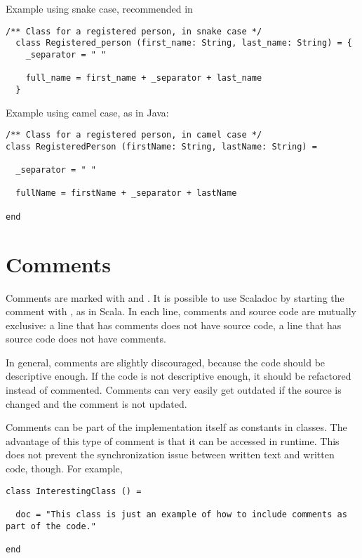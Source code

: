 Example using snake case, recommended in \Soda

\begin{lstlisting}[label={lst:exampleExtendsSnakeCase}]
  /** Class for a registered person, in snake case */
  class Registered_person (first_name: String, last_name: String) = {
    _separator = " "

    full_name = first_name + _separator + last_name
  }
\end{lstlisting}

Example using camel case, as in Java:
\begin{lstlisting}[label={lst:exampleExtendsCamelCase}]
/** Class for a registered person, in camel case */
class RegisteredPerson (firstName: String, lastName: String) =

  _separator = " "

  fullName = firstName + _separator + lastName

end
\end{lstlisting}


\section{Comments}

Comments are marked with \srccode{/*} and \srccode{*/}.
It is possible to use Scaladoc by starting the comment with \srccode{/**}, as in Scala.
In each line, comments and source code are mutually exclusive: a line that has comments does not have source code, a line that has source code does not have comments.

In general, comments are slightly discouraged, because the code should be descriptive enough. %
If the code is not descriptive enough, it should be refactored instead of commented.
Comments can very easily get outdated if the source is changed and the comment is not updated.

Comments can be part of the implementation itself as constants in classes.
The advantage of this type of comment is that it can be accessed in runtime.
This does not prevent the synchronization issue between written text and written code, though.
For example,

\begin{lstlisting}[label={lst:exampleClassWithComment}]
class InterestingClass () =

  doc = "This class is just an example of how to include comments as part of the code."

end
\end{lstlisting}

